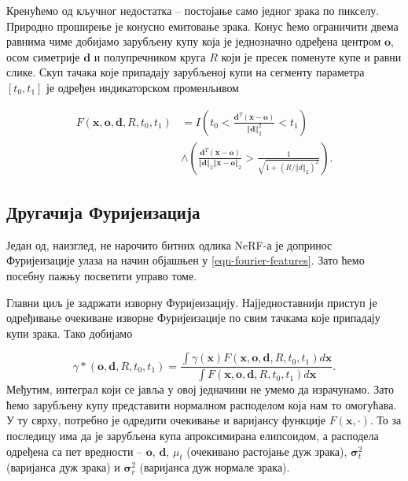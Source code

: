 \documentclass[12pt, a4paper, twoside]{book}
\numberwithin{equation}{chapter}
\numberwithin{theorem}{section}
\numberwithin{definition}{section}
\numberwithin{definitionChapter}{chapter}
\begin{document}
Кренућемо од кључног недостатка -- постојање само једног зрака по пикселу. Природно проширење
је конусно емитовање зрака. Конус ћемо ограничити двема равнима чиме добијамо зарубљену купу
која је једнозначно одређена центром $\mathbf{o}$, осом симетрије $\mathbf{d}$ и полупречником
круга $R$ који је пресек поменуте купе и равни слике. Скуп тачака које припадају зарубљеној купи
на сегменту параметра $\left[t_0, t_1\right]$ је одређен индикаторском променљивом

\begin{equation}
	\begin{split}
		F(\mathbf{x}, \mathbf{o}, \mathbf{d}, R, t_0, t_1) & =
			I \left(t_0 < \frac{\mathbf{d}^T(\mathbf{x} - \mathbf{o})}{\left\Vert\mathbf{d}\right\Vert^2_2} < t_1 \right) \\
			& \land
			\left(
				\frac{\mathbf{d}^T(\mathbf{x} - \mathbf{o})}
				{\left\Vert\mathbf{d}\right\Vert_2 \left\Vert \mathbf{x} - \mathbf{o}\right\Vert_2}
				> \frac{1}{\sqrt{1 + (R / \left\Vert d\right\Vert_2)^2}}
			\right).
	\end{split}
\end{equation}

\subsection{Другачија Фуријеизација}
Један од, наизглед, не нарочито битних одлика NeRF-а је допринос Фуријеизације улаза на начин
објашњен у \ref{eqn-fourier-features}. Зато ћемо посебну пажњу посветити управо томе.

Главни циљ је задржати изворну Фуријеизацију. Најједноставнији приступ је одређивање очекиване
изворне Фуријеизације по свим тачкама које припадају купи зрака. Тако добијамо

\begin{equation}
	\gamma*(\mathbf{o}, \mathbf{d}, R, t_0, t_1)
		= \frac{\int\gamma(\mathbf{x})F(\mathbf{x}, \mathbf{o}, \mathbf{d}, R, t_0, t_1)d\mathbf{x}}
				{\int F(\mathbf{x}, \mathbf{o}, \mathbf{d}, R, t_0, t_1)d\mathbf{x}}.
	\label{eqn-ipe-raw}
\end{equation}
Међутим, интеграл који се јавља у овој једначини не умемо да израчунамо. Зато ћемо зарубљену купу
представити нормалном расподелом која нам то омогућава. У ту сврху, потребно је одредити
очекивање и варијансу функције $F(\mathbf{x}, \cdot)$. То за последицу има да је зарубљена купа
апроксимирана елипсоидом, а расподела одређена са пет вредности -- $\mathbf{o}$,
$\mathbf{d}$, $\mu_t$ (очекивано растојање дуж зрака), $\mathbf{\sigma}^2_t$ (варијанса дуж зрака) и
$\mathbf{\sigma}^2_r$ (варијанса дуж нормале зрака).
\end{document}
